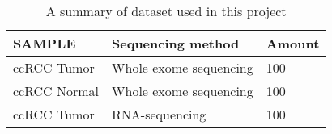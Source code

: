 \begin{table}[!ht]
\centering
\caption{A summary of dataset used in this project}
~\\
\label{tab:sample-table}
\begin{tabular}{lll}
\toprule
\textbf{SAMPLE}		  &\textbf{Sequencing method}	& \textbf{Amount}                                                                                                                                                  \\ \toprule
ccRCC Tumor                &Whole exome sequencing  & 100 \\
\midrule
ccRCC Normal 	& Whole exome sequencing & 100 \\
\midrule
ccRCC Tumor         & RNA-sequencing        & 100\\
\bottomrule
\end{tabular}
\end{table}

